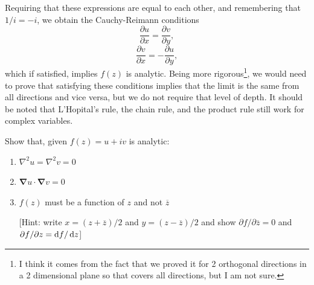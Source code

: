 %
Requiring that these expressions are equal to each other, and remembering that $1/i=-i$, we obtain the Cauchy-Reimann conditions
%
\begin{equation}
\frac{\partial u}{\partial x}=\frac{\partial v}{\partial y},
\end{equation}
\begin{equation*}
\frac{\partial v}{\partial x}=-\frac{\partial u}{\partial y}, 
\end{equation*}
%
which if satisfied, implies $f(z)$ is analytic.
 Being more rigorous\footnote{I think it comes from the fact that we proved it for 2 orthogonal directions in a 2 dimensional plane so that covers all directions, but I am not sure.}, we would need to prove that satisfying these conditions implies that the limit is the same from all directions and vice versa, but we do not require that level of depth. 
 It should be noted that L'Hopital's rule, the chain rule, and the product rule still work for complex variables.
%
%
\begin{examples}
	Show that, given $f(z)=u+iv$ is analytic:
	\begin{enumerate}
		\item $\nabla^2u=\nabla^2v=0$
		\item $\pmb{\nabla} u \cdot \pmb{\nabla} v=0$
		\item $f(z)$ must be a function of $z$ and not $\overline{z}$
		
		[Hint: write $x=(z+\overline{z})/2$ and $y=(z-\overline{z})/2$ and show $\partial f/\partial \overline{z}=0$ and $\partial f/\partial z=\mathop{}\!\mathrm{d} f/\mathop{}\!\mathrm{d} z$]
	\end{enumerate}
\end{examples}
